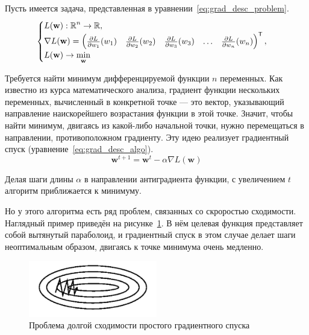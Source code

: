 Пусть имеется задача, представленная в уравнении \ref*{eq:grad_desc_problem}.
\begin{equation}
    \label{eq:grad_desc_problem}
    \begin{cases}
        L(\mathbf{w}): \operatorname{\mathbb{R}}^n \rightarrow \operatorname{\mathbb{R}}, \\
        \nabla L(\mathbf{w}) = \left(\begin{matrix}
            \frac{\partial L}{\partial w_1}(w_1) &
            \frac{\partial L}{\partial w_2}(w_2) &
            \frac{\partial L}{\partial w_3}(w_3) &
            \hdots &
            \frac{\partial L}{\partial w_n}(w_n)
        \end{matrix}\right)^\mathsf{T}, \\
        L(\mathbf{w}) \rightarrow \min\limits_\mathbf{w}
    \end{cases}
\end{equation}

Требуется найти минимум дифференцируемой функции $n$ переменных. Как известно из курса математического анализа, градиент функции нескольких переменных, вычисленный в конкретной точке --- это вектор, указывающий направление наискорейшего возрастания функции в этой точке. Значит, чтобы найти минимум, двигаясь из какой-либо начальной точки, нужно перемещаться в направлении, противоположном градиенту. Эту идею реализует градиентный спуск (уравнение \ref*{eq:grad_desc_algo}).
\begin{equation}
    \label{eq:grad_desc_algo}
    \mathbf{w}^{t+1}=\mathbf{w}^t-\alpha\nabla L(\mathbf{w})
\end{equation}

Делая шаги длины $\alpha$ в направлении антиградиента функции, с увеличением $t$ алгоритм приближается к минимуму.

Но у этого алгоритма есть ряд проблем, связанных со скроростью сходимости. Наглядный пример приведён на рисунке \ref*{fig:grad_desc_problem}. В нём целевая функция представляет собой вытянутый параболоид, и градиентный спуск в этом случае делает шаги неоптимальным образом, двигаясь к точке минимума очень медленно.

\begin{figure}[h]
    \centering
    \includegraphics[width=0.5\textwidth]{../inc/images/gradient_descend_problem.png}
    \caption{Проблема долгой сходимости простого градиентного спуска}
    \label{fig:grad_desc_problem}
\end{figure}

